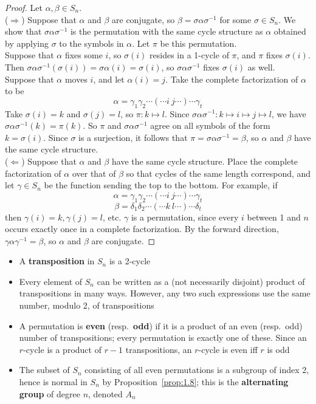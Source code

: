 \documentclass[../Odyssey_Project.tex]{subfiles}
\begin{document}
\begin{proof}
    Let \(\alpha, \beta \in S_n\). \\
    (\(\Rightarrow\)) Suppose that \(\alpha\) and \(\beta\) are conjugate, so \(\beta = \sigma \alpha \sigma^{-1}\) for some \(\sigma \in S_n\). We show that \(\sigma \alpha \sigma^{-1}\) is the permutation with the same cycle structure as \(\alpha\) obtained by applying \(\sigma\) to the symbols in \(\alpha\). Let \(\pi\) be this permutation. \\
    Suppose that \(\alpha\) fixes some \(i\), so \(\sigma(i)\) resides in a 1-cycle of \(\pi\), and \(\pi\) fixes \(\sigma(i)\). Then \(\sigma \alpha \sigma^{-1}(\sigma(i)) = \sigma\alpha(i) = \sigma(i)\), so \(\sigma \alpha \sigma^{-1}\) fixes \(\sigma(i)\) as well. \\
    Suppose that \(\alpha\) moves \(i\), and let \(\alpha(i) = j\). Take the complete factorization of \(\alpha\) to be
    \[\alpha = \gamma_1 \gamma_2 \cdots (\cdots i \ j \cdots) \cdots \gamma_t\]
    Take \(\sigma(i) = k\) and \(\sigma(j) = l\), so \(\pi: k \mapsto l\). Since \(\sigma\alpha\sigma^{-1}: k \mapsto i \mapsto j \mapsto l\), we have \(\sigma\alpha\sigma^{-1}(k) = \pi(k)\). So \(\pi\) and \(\sigma\alpha\sigma^{-1}\) agree on all symbols of the form \(k = \sigma(i)\). Since \(\sigma\) is a surjection, it follows that \(\pi = \sigma\alpha\sigma^{-1} = \beta\), so \(\alpha\) and \(\beta\) have the same cycle structure. \\
    (\(\Leftarrow\)) Suppose that \(\alpha\) and \(\beta\) have the same cycle structure. Place the complete factorization of \(\alpha\) over that of \(\beta\) so that cycles of the same length correspond, and let \(\gamma \in S_n\) be the function sending the top to the bottom. For example, if
    \[\alpha = \gamma_1 \gamma_2 \cdots (\cdots i \ j \cdots) \cdots \gamma_t\]
    \[\beta = \delta_1 \delta_2 \cdots (\cdots k \ l \cdots) \cdots \delta_t\]
	    then \(\gamma(i) = k, \gamma(j) = l\), etc. \(\gamma\) is a permutation, since every \(i\) between 1 and \(n\) occurs exactly once in a complete factorization. By the forward direction, \(\gamma \alpha \gamma^{-1} = \beta\), so \(\alpha\) and \(\beta\) are conjugate.
\end{proof}
\begin{itemize}
    \item A \textbf{transposition} in \(S_n\) is a 2-cycle
    \item Every element of \(S_n\) can be written as a (not necessarily disjoint) product of transpositions in many ways. However, any two such expressions use the same number, modulo 2, of transpositions
    \item A permutation is \textbf{even} (resp.\ \textbf{odd}) if it is a product of an even (resp.\ odd) number of transpositions; every permutation is exactly one of these. Since an \(r\)-cycle is a product of \(r-1\) transpositions, an \(r\)-cycle is even iff \(r\) is odd
    \item The subset of \(S_n\) consisting of all even permutations is a subgroup of index 2, hence is normal in \(S_n\) by Proposition~\ref{prop:1.8}; this is the \textbf{alternating group} of degree \(n\), denoted \(A_n\)
\end{itemize}
\end{document}
